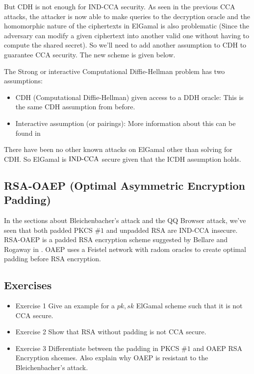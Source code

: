 \indent But CDH is not enough for IND-CCA security. As seen in the previous CCA attacks, the attacker is now able to make queries to the decryption oracle and the homomorphic nature of the ciphertexts in ElGamal is also problematic (Since the adversary can modify a given ciphertext into another valid one without having to compute the shared secret). So we'll need to add another assumption to CDH to guarantee CCA security. The new scheme is given below. \newline

\indent The Strong or interactive Computational Diffie-Hellman problem has two assumptions:
\begin{itemize}
\item CDH (Computational Diffie-Hellman) given access to a DDH oracle: This is the same CDH assumption from before.
\item Interactive assumption (or pairings): More information about this can be found in \cite{icdh}
\end{itemize}

There have been no other known attacks on ElGamal other than solving for CDH. So ElGamal is $\textnormal{IND-CCA}$ secure given that the ICDH assumption holds.


\subsection{RSA-OAEP (Optimal Asymmetric Encryption Padding)}
In the sections about Bleichenbacher's attack and the QQ Browser attack, we've seen that both padded PKCS $\# 1$ and unpadded RSA are IND-CCA insecure. RSA-OAEP is a padded RSA encryption scheme suggested by Bellare and Rogaway in \cite{oaep}. OAEP uses a Feistel network with radom oracles to create optimal padding before RSA encryption. 

\subsection{Exercises}
\begin{itemize}
\item {Exercise 1} Give an example for a $pk,sk$ ElGamal scheme such that it is not CCA secure.
\item {Exercise 2} Show that RSA without padding is not CCA secure.
\item {Exercise 3} Differentiate between the padding in PKCS $\# 1$ and OAEP RSA Encryption shcemes. Also explain why OAEP is resistant to the Bleichenbacher's attack.
\end{itemize}



